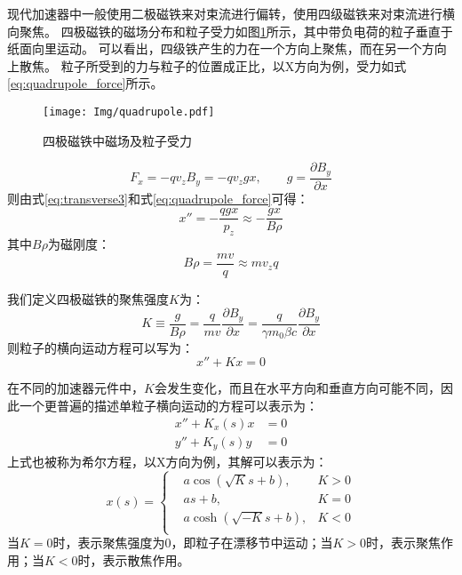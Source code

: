 现代加速器中一般使用二极磁铁来对束流进行偏转，使用四级磁铁来对束流进行横向聚焦。
四极磁铁的磁场分布和粒子受力如图\ref{fig:quadrupole}所示\cite{qinq2011ring}，其中带负电荷的粒子垂直于纸面向里运动。
可以看出，四级铁产生的力在一个方向上聚焦，而在另一个方向上散焦。
粒子所受到的力与粒子的位置成正比，以X方向为例，受力如式\ref{eq:quadrupole_force}所示。
\begin{figure}[!htb]
    \centering
    \texttt{[image: Img/quadrupole.pdf]}
    \caption{四极磁铁中磁场及粒子受力}
    \label{fig:quadrupole}
\end{figure}
\begin{equation}
    \label{eq:quadrupole_force}
    F_x = -q {v}_{z} {B}_{y} = -q {v}_{z} g x, \qquad g=\frac{\partial B_y}{\partial x}
\end{equation}
则由式\ref{eq:transverse3}和式\ref{eq:quadrupole_force}可得：
\begin{equation}
    \label{eq:quadrupole_force2}
    x'' = -\frac{qgx}{p_z} \approx -\frac{gx}{B\rho}
\end{equation}
其中${B\rho}$为磁刚度：
\begin{equation}
    {B\rho}=\frac{mv}{q}\approx{mv_z}{q}
\end{equation}

我们定义四极磁铁的聚焦强度$K$为：
\begin{equation}
    \label{eq:quadrupole_force3}
    K \equiv \frac{g}{B\rho} = \frac{q}{mv}                 \frac{\partial B_y}{\partial x}
                             = \frac{q}{\gamma m_0 \beta c} \frac{\partial B_y}{\partial x}
\end{equation}
则粒子的横向运动方程可以写为：
\begin{equation}
    \label{eq:Mathier_Hill_x}
    x'' + Kx =0
\end{equation}

在不同的加速器元件中，$K$会发生变化，而且在水平方向和垂直方向可能不同，因此一个更普遍的描述单粒子横向运动的方程可以表示为：
\begin{equation}
    \label{eq:Mathier_Hill}
    \begin{aligned}
        x'' + K_x(s)x &= 0 \\
        y'' + K_y(s)y &= 0
    \end{aligned}
\end{equation}
上式也被称为希尔方程，以X方向为例，其解可以表示为\cite{abramowitz1964handbook}：
\begin{equation}
    \label{eq:Mathier_Hill_solver}
    x(s)=\left\{
    \begin{aligned}
        &a\cos (\sqrt{K}s+b) ,& K>0 \\
        &as+b                ,& K=0 \\
        &a\cosh(\sqrt{-K}s+b),& K<0 \\
    \end{aligned}
    \right.
\end{equation}
当$K=0$时，表示聚焦强度为0，即粒子在漂移节中运动；当$K>0$时，表示聚焦作用；当$K<0$时，表示散焦作用。

